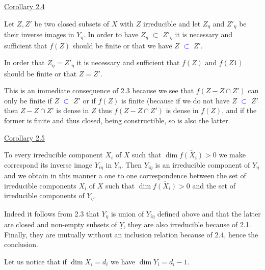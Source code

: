 \documentclass[11pt]{article}
\newcommand{\scanpage}[1]{\par\bigskip\noindent{\small\sffamily[scan #1]}\par}
\newcommand{\mspage}[1]{{\small\sffamily[p.\,#1]}}
\newcommand{\hand}[1]{\textcolor{blue}{#1}}
\newcommand{\uline}[1]{\underline{#1}}
\begin{document}
\clearpage
\scanpage{24/11}
\mspage{11}

\uline{Corollary 2.4}

Let $Z,Z'$ be two closed subsets of $X$ with $Z$ irreducible and let
$Z_\eta$ and $Z'_\eta$ be their inverse images in $Y_\eta$. In order to have
$Z_\eta$ \hand{$\subset$} $Z'_\eta$ it is necessary and sufficient that $f(Z)$ should be
finite or that we have $Z$ \hand{$\subset$} $Z'$.

In order that $Z_\eta = Z'_\eta$ it is necessary and sufficient that
$f(Z)$ and $f(Z1)$ should be finite or that $Z = Z'$.

This is an immediate consequence of 2.3 because we see that
$f(Z - Z\cap Z')$ can only be finite if $Z$ \hand{$\subset$} $Z'$ or if $f(Z)$ is finite
(because if we do not have $Z$ \hand{$\subset$} $Z'$ then $Z - Z\cap Z'$ is dense in $Z$
thus $f(Z - Z\cap Z')$ is dense in $f(Z)$, and if the former is finite and
thus closed, being constructible, so is also the latter.

\uline{Corollary 2.5}

To every irreducible component $X_i$ of $X$ such that $\dim \overline{f(X_i)} > 0$
we make correspond its inverse image $Y_{i\eta}$ in $Y_\eta$. Then $Y_{i\eta}$ is an
irreducible component of $Y_\eta$ and we obtain in this manner a one to
one correspondence between the set of irreducible components $X_i$ of
$X$ such that $\dim \overline{f(X_i)} > 0$ and the set of irreducible components of
$Y_\eta$.

Indeed it follows from 2.3 that $Y_\eta$ is union of $Y_{i\eta}$ defined
above and that the latter are closed and non-empty subsets of $\underline{Y}$,
they are also irreducible because of 2.1. Finally, they are
mutually without an inclusion relation because of 2.4, hence the
conclusion.

Let us notice that if $\dim X_i = d_i$ we have $\dim Y_i = d_i - 1$.

\clearpage
\scanpage{24/12}
\mspage{12}
\end{document}
